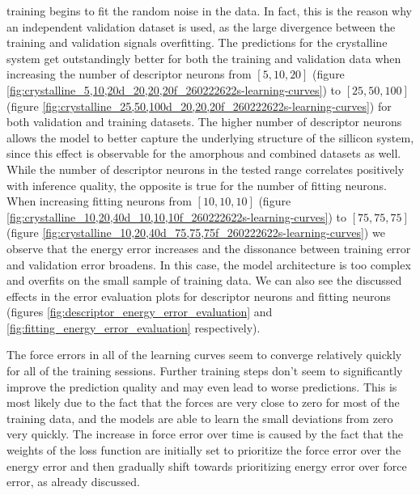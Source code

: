 training begins to fit the random noise in the data. In fact, this is the
reason why an independent validation dataset is used, as the large divergence
between the training and validation signals overfitting.
The predictions for the crystalline system get outstandingly better for both
the training and validation data when increasing the number of descriptor
neurons from $[5, 10, 20]$ (figure
\ref{fig:crystalline_5,10,20d_20,20,20f_260222622s-learning-curves}) to
$[25, 50, 100]$ (figure
\ref{fig:crystalline_25,50,100d_20,20,20f_260222622s-learning-curves}) for
both validation and training datasets. The higher number of descriptor
neurons allows the model to better capture the underlying structure of the
sillicon system, since this effect is observable for the amorphous and
combined datasets as well. While the number of descriptor neurons in the tested
range correlates positively with inference quality, the opposite is true for
the number of fitting neurons. When increasing fitting neurons from
$[10, 10, 10]$
(figure \ref{fig:crystalline_10,20,40d_10,10,10f_260222622s-learning-curves})
to $[75, 75, 75]$
(figure \ref{fig:crystalline_10,20,40d_75,75,75f_260222622s-learning-curves})
we observe that the energy error increases and the dissonance between
training error and validation error broadens. In this case, the model
architecture is too complex and overfits on the small sample of training data.
We can also see the discussed effects in the error evaluation plots for
descriptor neurons and fitting neurons (figures
\ref{fig:descriptor_energy_error_evaluation} and
\ref{fig:fitting_energy_error_evaluation} respectively).

The force errors in all of the learning curves seem to converge relatively
quickly for all of the training sessions. Further training steps don't seem to
significantly improve the prediction quality and may even lead to worse
predictions. This is most likely due to the fact that the forces are very
close to zero for most of the training data, and the models are able to learn
the small deviations from zero very quickly. The increase in force error over
time is caused by the fact that the weights of the loss function are
initially set to prioritize the force error over the energy error and then
gradually shift towards prioritizing energy error over force error, as already
discussed.

